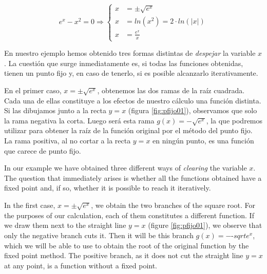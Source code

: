\begin{equation*}
e^x-x^2=0 \Rightarrow \left\{
\begin{aligned}
x&=\pm  \sqrt{e^x}\\
x&= ln(x^2)=2\cdot ln(\vert x \vert)\\
x&=\frac{e^x}{x} 
\end{aligned} 
\right.
\end{equation*}


\begin{paracol}{2}    
En nuestro ejemplo hemos obtenido tres formas distintas de \emph{despejar} la variable $x$. La cuestión que surge inmediatamente es, si todas las funciones obtenidas, tienen un punto fijo y, en caso de tenerlo, si es posible alcanzarlo iterativamente.

En el primer caso, $x=\pm \sqrt{e^x}$, obtenemos las dos ramas de la raíz cuadrada. Cada una de ellas constituye a los efectos de nuestro cálculo una función distinta. Si las dibujamos junto a la recta $y=x$ (figura \ref{fig:pfijo01}), observamos que solo la rama negativa la corta. Luego será  esta rama $g(x)=-\sqrt{e^x}$,  la que podremos utilizar para obtener la raíz de la función original por el método del punto fijo. La rama positiva, al no cortar a la recta $y=x$ en ningún punto, es una función que carece de punto fijo.

\switchcolumn
    
In our example we have obtained three different ways of \emph{clearing} the variable $x$. The question that immediately arises is whether all the functions obtained have a fixed point and, if so, whether it is possible to reach it iteratively.

In the first case, $x=\pm \sqrt{e^x}$, we obtain the two branches of the square root. For the purposes of our calculation, each of them constitutes a different function. If we draw them next to the straight line $y=x$ (figure \ref{fig:pfijo01}), we observe that only the negative branch cuts it. Then it will be this branch $g(x)=-$-$sqrt{e^x}$, which we will be able to use to obtain the root of the original function by the fixed point method. The positive branch, as it does not cut the straight line $y=x$ at any point, is a function without a fixed point.
\end{paracol}

